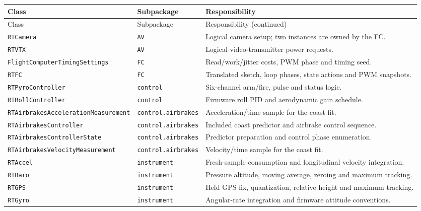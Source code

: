 \documentclass[10pt,letterpaper]{article}
\newcommand{\code}[1]{\nolinkurl{#1}}
\newcommand{\class}[1]{\nolinkurl{#1}}
\begin{document}
\small
\begin{longtable}{@{}>{\raggedright\arraybackslash}p{5.65cm}>{\raggedright\arraybackslash}p{2.1cm}>{\raggedright\arraybackslash}p{7.4cm}@{}}
\toprule Class & Subpackage & Responsibility\\\midrule
\endfirsthead
\toprule Class & Subpackage & Responsibility (continued)\\\midrule
\endhead
\bottomrule
\endfoot
\class{RTCamera} & \code{AV} & Logical camera setup; two instances are owned by the FC.\\
\class{RTVTX} & \code{AV} & Logical video-transmitter power requests.\\
\class{FlightComputerTimingSettings} & \code{FC} & Read/work/jitter costs, PWM phase and timing seed.\\
\class{RTFC} & \code{FC} & Translated sketch, loop phases, state actions and PWM snapshots.\\
\class{RTPyroController} & \code{control} & Six-channel arm/fire, pulse and status logic.\\
\class{RTRollController} & \code{control} & Firmware roll PID and aerodynamic gain schedule.\\
\class{RTAirbrakesAccelerationMeasurement} & \code{control.}\newline\code{airbrakes} & Acceleration/time sample for the coast fit.\\
\class{RTAirbrakesController} & \code{control.}\newline\code{airbrakes} & Included coast predictor and airbrake control sequence.\\
\class{RTAirbrakesControllerState} & \code{control.}\newline\code{airbrakes} & Predictor preparation and control phase enumeration.\\
\class{RTAirbrakesVelocityMeasurement} & \code{control.}\newline\code{airbrakes} & Velocity/time sample for the coast fit.\\
\class{RTAccel} & \code{instrument} & Fresh-sample consumption and longitudinal velocity integration.\\
\class{RTBaro} & \code{instrument} & Pressure altitude, moving average, zeroing and maximum tracking.\\
\class{RTGPS} & \code{instrument} & Held GPS fix, quantization, relative height and maximum tracking.\\
\class{RTGyro} & \code{instrument} & Angular-rate integration and firmware attitude conventions.\\

\end{longtable}
\end{document}
